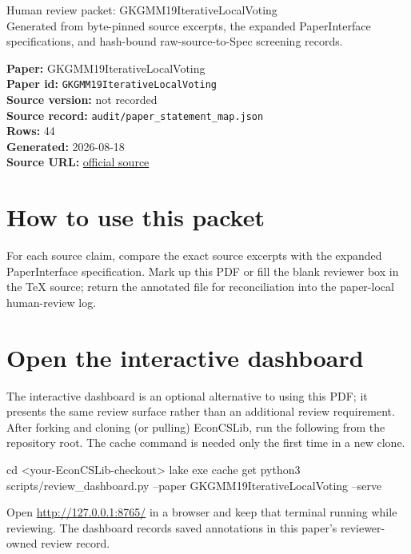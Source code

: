 \documentclass[10pt]{article}
\begin{document}
\fontsize{9}{10}\selectfont

\begin{center}
{\LARGE Human review packet: GKGMM19IterativeLocalVoting}\\[0.35em]
\small Generated from byte-pinned source excerpts, the expanded PaperInterface
specifications, and hash-bound raw-source-to-Spec screening records.
\end{center}

\noindent\textbf{Paper:} GKGMM19IterativeLocalVoting\\
\textbf{Paper id:} \texttt{GKGMM19IterativeLocalVoting}\\
\textbf{Source version:} not recorded\\
\textbf{Source record:} \texttt{audit/paper\_statement\_map.json}\\
\textbf{Rows:} 44\\
\textbf{Generated:} 2026-08-18\\
\textbf{Source URL:} \href{https://arxiv.org/pdf/1702.07984}{official source}

\noindent{}\par



\section*{How to use this packet}
For each source claim, compare the exact source excerpts with the expanded
PaperInterface specification. Mark up this PDF or fill the blank reviewer box in the TeX source;
return the annotated file for reconciliation into the paper-local human-review
log.

\section*{Open the interactive dashboard}
The interactive dashboard is an optional alternative to using this PDF; it
presents the same review surface rather than an additional review requirement.
After forking and cloning (or pulling) EconCSLib, run the following from the
repository root. The cache command is needed only the first time in a new clone.
\begin{ReviewVerbatim}
cd <your-EconCSLib-checkout>
lake exe cache get
python3 scripts/review_dashboard.py --paper GKGMM19IterativeLocalVoting --serve
\end{ReviewVerbatim}
Open \url{http://127.0.0.1:8765/} in a browser and keep that terminal running
while reviewing. The dashboard records saved annotations in this paper's
reviewer-owned review record.
\end{document}

